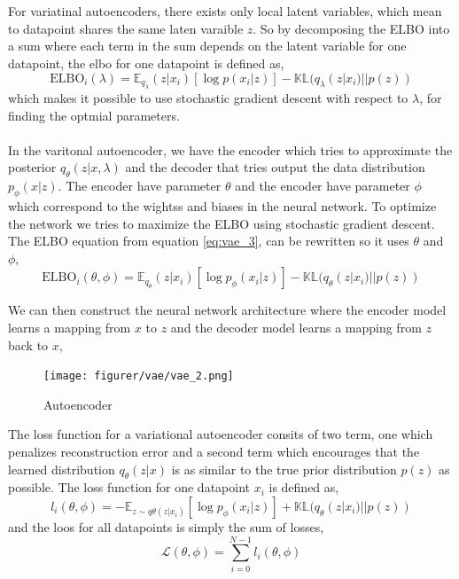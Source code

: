 \documentclass[11pt]{article}
\begin{document}
\\ \\
For variatinal autoencoders, there exists only local latent variables, which mean to datapoint shares the same laten varaible $z$. So by decomposing the ELBO into a sum where each term in the sum depends on the latent variable for one datapoint, the elbo for one datapoint is defined as,
\begin{equation}\label{eq:vae_3}
    \text{ELBO}_{i}(\lambda) = \mathds{E}_{q_{\lambda}}(z | x_{i}) [\log p(x_{i} | z)] - \mathbb{KL}(q_{\lambda} (z | x_{i}) || p(z))
\end{equation}
which makes it possible to use stochastic gradient descent with respect to $\lambda$, for finding the optmial parameters.
\\ \\
In the varitonal autoencoder, we have the encoder which tries to approximate the posterior $q_{\theta}(z | x, \lambda)$ and the decoder that tries output the data distribution $p_\phi(x | z)$. The encoder have parameter $\theta$ and the encoder have parameter $\phi$ which correspond to the wightss and biases in the neural network. To optimize the network we tries to maximize the ELBO using stochastic gradient descent. The ELBO equation from equation \ref{eq:vae_3}, can be rewritten so it uses $\theta$ and $\phi$,
\begin{equation}\label{eq:vae_3}
    \text{ELBO}_{i}(\theta, \phi) = \mathds{E}_{q_{\theta}}(z | x_{i}) [\log p_\phi(x_{i} | z)] - \mathbb{KL}(q_{\theta} (z | x_{i}) || p(z))
\end{equation}

We can then construct the neural network architecture where the encoder model learns a mapping from $x$ to $z$ and the decoder model learns a mapping from $z$ back to $x$,
\begin{figure}[!h]
    \centering
    \texttt{[image: figurer/vae/vae\_2.png]}
    \caption{Autoencoder}
    \label{fig:vae}
\end{figure}
The loss function for a variational autoencoder consits of two term, one which penalizes reconstruction error and a second term which encourages that the learned distribution $q_\theta(z|x)$ is as similar to the true prior distribution $p(z)$ as possible. The loss function for one datapoint $x_{i}$ is defined as,
\begin{equation}
    l_{i}(\theta, \phi) = - \mathds{E}_{z \sim q\theta(z | x_{i})} [\log p_{\phi} (x_{i} | z)] + \mathbb{KL}(q_{\theta}(z | x_{i}) || p(z))
\end{equation}
and the loos for all datapoints is simply the sum of losses,
\begin{equation}
    \mathcal{L}(\theta, \phi) = \sum_{i = 0}^{N - 1} l_{i}(\theta, \phi)
\end{equation}
\end{document}

